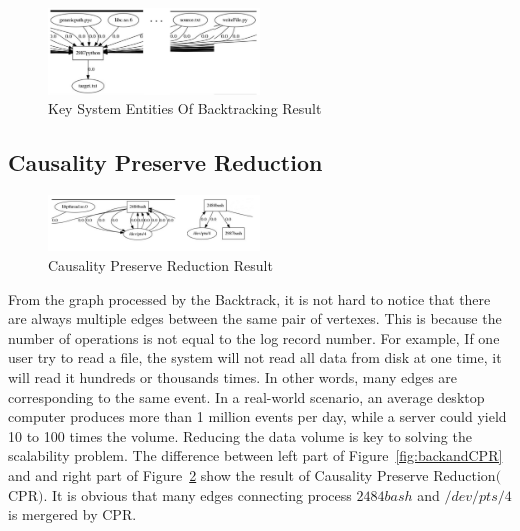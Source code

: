 \begin{figure}[!htb]
	\centering
	\includegraphics[width=0.5\textwidth]{simpleBack.png}
	\caption{Key System Entities Of Backtracking Result}
	\label{fig:simpleBack}
\end{figure}
\subsection{Causality Preserve Reduction}
\begin{figure}[!htb]
	\centering
	\includegraphics[width=0.5\textwidth]{simpleCPR.png}
	\caption{Causality Preserve Reduction Result}
	\label{fig:simpleCPR}
\end{figure}
From the graph processed by the Backtrack, it is not hard to notice that there are always multiple edges between the same pair of vertexes. This is because the number of operations is not equal to the log record number. For example, If one user try to read a file, the system will not read all data from disk at one time, it will read it hundreds or thousands times. In other words, many edges are corresponding to the same event. In a real-world scenario, an average desktop computer produces more than 1 million events per day, while a server could yield 10 to 100 times the volume. 
Reducing the data volume is key to solving the scalability problem. The difference between left part of Figure~\ref{fig:backandCPR} and and right part of Figure~\ref{fig:simpleCPR} show the result of Causality Preserve Reduction$($CPR$)$. It is obvious that many edges connecting  process $2484bash$ and $/dev/pts/4$ is mergered by CPR.


